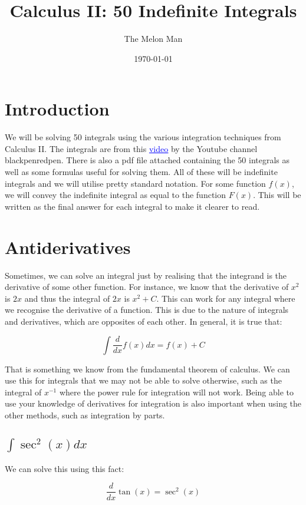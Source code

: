 \documentclass[12pt]{article}
\title{Calculus II: 50 Indefinite Integrals}
\author{The Melon Man}
\date{\today}
\begin{document}
\maketitle

\section*{Introduction}

We will be solving 50 integrals using the various integration techniques from Calculus II.
The integrals are from this \href{https://youtu.be/XOUwIdufY9Y}{\textcolor{blue}{{\underline{video}}}} by the Youtube channel blackpenredpen.
There is also a pdf file attached containing the 50 integrals as well as some formulas useful for solving them.
All of these will be indefinite integrals and we will utilise pretty standard notation.
For some function $f(x)$, we will convey the indefinite integral as equal to the function $F(x)$.
This will be written as the final answer for each integral to make it clearer to read.

\section{Antiderivatives}

Sometimes, we can solve an integral just by realising that the integrand is the derivative of some other function.
For instance, we know that the derivative of $x^2$ is $2x$ and thus the integral of $2x$ is $x^2+C$.
This can work for any integral where we recognise the derivative of a function.
This is due to the nature of integrals and derivatives, which are opposites of each other.
In general, it is true that:

$$
    \int \frac{d}{dx}f(x) dx = f(x) + C
$$

That is something we know from the fundamental theorem of calculus.
We can use this for integrals that we may not be able to solve otherwise, such as the integral of $x^{-1}$ where the power rule for integration will not work.
Being able to use your knowledge of derivatives for integration is also important when using the other methods, such as integration by parts.

\subsection{$\int \sec^2(x) dx$}

We can solve this using this fact:

$$
    \frac{d}{dx} \tan(x) = \sec^2(x)
$$
\end{document}

